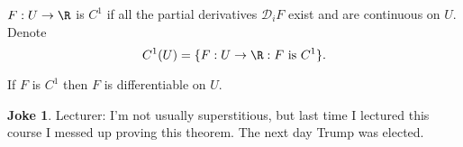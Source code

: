 \documentclass[a4paper]{article}
\newcommand*{\D}{\mathcal{D}}
\theoremstyle{definition}
\newtheorem*{joke}{Joke}
\begin{document}
\begin{definition}[\(C^1\) space]
  \(F: U \to \R\) is \(C^1\) if all the partial derivatives \(\D_i F\) exist and are continuous on \(U\). Denote
  \[
    C^1(U) = \{F: U \to \R: F \text{ is } C^1\}.
  \]
\end{definition}

\begin{theorem}
  \label{thm:C1 implies differentiability}
  If \(F\) is \(C^1\) then \(F\) is differentiable on \(U\).
\end{theorem}

\begin{joke}
  Lecturer: I'm not usually superstitious, but last time I lectured this course I messed up proving this theorem. The next day Trump was elected.
\end{joke}
\end{document}
